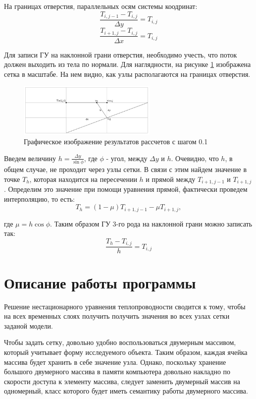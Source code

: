 \documentclass[12pt, a4paper]{article}
\begin{document}
	На границах отверстия, параллельных осям системы коодринат:
	\[
	\frac{T_{i,j-1} - T_{i,j}}{\Delta y} = T_{i,j}
	\]
	\[
	\frac{T_{i+1,j} - T_{i,j}}{\Delta x} = T_{i,j}
	\]
	
	Для записи ГУ на наклонной грани отверстия, необходимо учесть, что поток должен выходить из тела по нормали. Для наглядности, на рисунке \ref{fig:picScaled} изображена сетка в масштабе. На нем видно, как узлы располагаются на границах отверстия.
	
	\begin{figure}[h]
		\centering    %
		\includegraphics[width=0.6\textwidth]{static/ScaledMMA.png}
		\caption{Графическое изображение результатов рассчетов с шагом 0.1} %
		\label{fig:picScaled} %
	\end{figure}

    Введем величину $h = \frac {\Delta y} {\sin \phi}$, где $\phi$ - угол, между $\Delta y$ и $h$. Очевидно, что $h$, в общем случае, не проходит через узлы сетки. В связи с этим найдем значение в точке $T_h$, которая находится на пересечении $h$ и прямой между $T_{i+1,j-1}$ и $T_{i+1,j}$. Определим это значение при помощи уравнения прямой, фактически проведем интерполяцию, то есть:
    \[
    T_h = (1 - \mu) T_{i+1,j-1} - \mu T_{i+1,j},
    \]
	
	где $\mu = h \cos \phi$. Таким образом ГУ 3-го рода на наклонной грани можно записать так:
	\[
	\frac{T_h - T_{i,j}}{h} = T_{i,j}
	\]
	
	\section{Описание работы программы}
	
	Решение нестационарного уравнения теплопроводности сводится к тому, чтобы на всех временных слоях получить получить значения во всех узлах сетки заданой модели.
	
	Чтобы задать сетку, довольно удобно воспользоваться двумерным массивом, который учитывает форму исследуемого объекта. Таким образом, каждая ячейка массива будет хранить в себе значение узла. Однако, поскольку хранение большого двумерного массива в памяти компьютера довольно накладно по скорости доступа к элементу массива, следует заменить двумерный массив на одномерный, класс которого будет иметь семантику работы двумерного массива.
	
\end{document}
